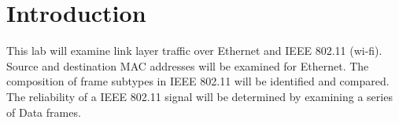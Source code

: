 \section{Introduction}\label{sec:intro}
This lab will examine link layer traffic over Ethernet and IEEE 802.11 (wi-fi). Source and destination MAC addresses will be examined for Ethernet. The composition of frame subtypes in IEEE 802.11 will be identified and compared. The reliability of a IEEE 802.11 signal will be determined by examining a series of Data frames.
